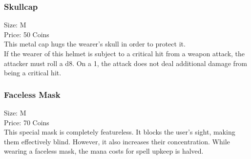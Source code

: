 \subsubsection{Skullcap}\label{item:skullCap}
Size: M\\
Price: 50 Coins\\
This metal cap hugs the wearer's skull in order to protect it.\\
If the wearer of this helmet is subject to a critical hit from a weapon attack, the attacker must roll a d8.
On a 1, the attack does not deal additional damage from being a critical hit.\\

\subsubsection{Faceless Mask}\label{item:facelessMask}
Size: M\\
Price: 70 Coins\\
This special mask is completely featureless.
It blocks the user's sight, making them effectively blind.
However, it also increases their concentration.
While wearing a faceless mask, the mana costs for spell upkeep is halved.\\
